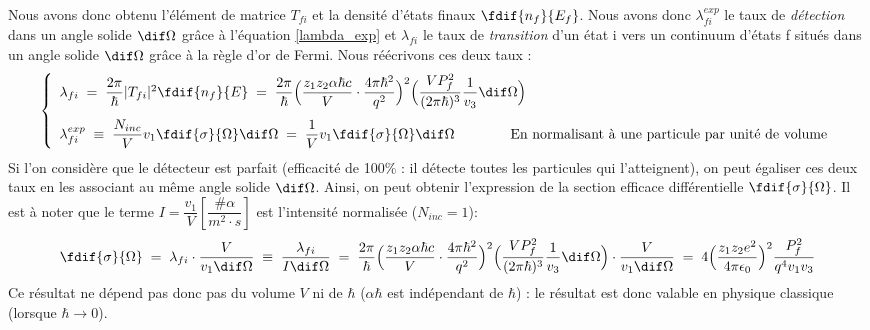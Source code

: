 Nous avons donc obtenu l'élément de matrice $T_{fi}$ et la densité d'états finaux $ \fdif{n_f}{E_f}$. Nous avons donc $\lambda_{fi}^{exp}$ le taux de \textit{détection} dans un angle solide $\dif\Omega$ grâce à l'équation \eqref{lambda_exp} et $\lambda_{fi}$ le taux de \textit{transition} d'un état i vers un continuum d'états f situés dans un angle solide $\dif\Omega$ grâce à la règle d'or de Fermi. Nous réécrivons ces deux taux :
\begin{equation*}
    \left\{
    \begin{array}{ll}
        \lambda_{fi} \eq
        \dfrac{2\pi}{\hbar} |T_{fi}|^2 \fdif{n_f}{E}
        \eq
        \dfrac{2\pi}{\hbar} 
        \Big(
            \dfrac{z_1 z_2\alpha\hbar c}{V} \cdot \dfrac{4 \pi \hbar^2}{q^2}  
        \Big)^2
        \Big(
        \dfrac{V P_f^2}{(2\pi\hbar)^3}\dfrac{1}{v_3}  \dif\Omega
        \Big)
    \\[13pt]
        \lambda_{fi}^{exp} 
            \; \equiv \;
        \dfrac{N_{inc}}{V} v_1 \fdif{\sigma}{\Omega} \dif\Omega
            \eq
        \dfrac{1}{V} v_1
        \fdif{\sigma}{\Omega} \dif\Omega \qquad \qquad \text{En normalisant à une particule par unité de volume}
    \end{array}
    \right.
\end{equation*}
Si l'on considère que le détecteur est parfait (efficacité de 100\% : il détecte toutes les particules qui l'atteignent), on peut égaliser ces deux taux en les associant au même angle solide $\dif\Omega$. Ainsi, on peut obtenir l'expression de la section efficace différentielle $\fdif{\sigma}{\Omega}$. Il est à noter que le terme $I = \dfrac{v_1}{V} \left[\dfrac{\# \alpha}{m^2\cdot s}\right]$ est l'intensité normalisée ($N_{inc} = 1$):
\begin{equation*}
    \fdif{\sigma}{\Omega}
        \eq
    \lambda_{fi} \cdot \dfrac{V}{v_1 \dif\Omega}
        \; \equiv \;
    \dfrac{ \lambda_{fi}}{I \dif\Omega}
        \eq
    \dfrac{2\pi}{\hbar} 
    \Big(
        \dfrac{z_1 z_2\alpha\hbar c}{V} \cdot \dfrac{4 \pi \hbar^2}{q^2}  
    \Big)^2
    \Big(
    \dfrac{V P_f^2}{(2\pi\hbar)^3}\dfrac{1}{v_3}  \dif\Omega
    \Big)
    \cdot
    \dfrac{V}{v_1 \dif\Omega}
        \eq
    4 \Big( \dfrac{z_1 z_2e^2}{4\pi\epsilon_0} \Big)^2 \dfrac{P_f^2}{q^4v_1v_3}
\end{equation*}
Ce résultat ne dépend pas donc pas du volume $V$ ni de $\hbar$ ($\alpha \hbar$ est indépendant de $\hbar$) : le résultat est donc valable en physique classique (lorsque $\hbar \rightarrow 0$).\\
